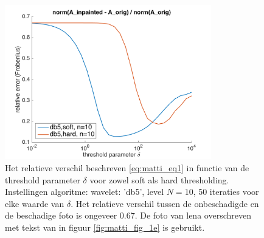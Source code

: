\begin{figure}
  \centering
    \includegraphics[width=0.8\textwidth]{../src/inpainting/error_plot_3}
    \caption{Het relatieve verschil beschreven \eqref{eq:matti_eq1} in functie van de threshold parameter $\delta$ voor zowel soft als hard thresholding. Instellingen algoritme: wavelet: 'db5', level $N = 10$, 50 iteraties voor elke waarde van $\delta$. Het relatieve verschil tussen de onbeschadigde en de beschadige foto is ongeveer $0.67$. De foto van lena overschreven met tekst van in figuur \ref{fig:matti_fig_1e} is gebruikt.}
    \label{fig:matti_error_plot_3}
\end{figure}

